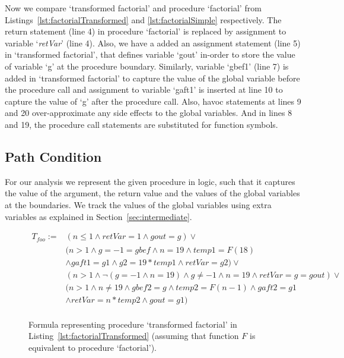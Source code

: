 \documentclass{llncs}
\newcommand{\foo}{\textit{foo}}
\newcommand{\pathCondition}{\mathit{T_{\foo}}}
\newcommand{\retVar}{\textit{retVar}}
\newcommand{\F}{\mathit{F}}
\begin{document}
Now we compare `transformed factorial' and procedure `factorial' from
Listings~\ref{lst:factorialTransformed} and \ref{lst:factorialSimple}
respectively. The return statement (line 4) in procedure `factorial'
is replaced by assignment to variable `\retVar' (line 4). Also, we
have a added an assignment statement (line 5) in `transformed
factorial', that defines variable `gout' in-order to store the value
of variable `g' at the procedure boundary. Similarly, variable `gbef1'
(line 7) is added in `transformed factorial' to capture the value of
the global variable before the procedure call and assignment to
variable `gaft1' is inserted at line 10 to capture the value of `g'
after the procedure call. Also, havoc statements at lines 9 and 20
over-approximate any side effects to the global variables. And in
lines 8 and 19, the procedure call statements are substituted for
function symbols.

\subsection{Path Condition}
For our analysis we represent the given procedure in logic, such that
it captures the value of the argument, the return value and the values
of the global variables at the boundaries. We track the values of the
global variables using extra variables as explained in
Section~\ref{sec:intermediate}.

\begin{figure}
  \begin{align*}
    \pathCondition :=
    &(n \leq 1 \wedge retVar = 1 \wedge gout = g) \vee \\
    &(n > 1 \wedge g = -1 = gbef \wedge n = 19 \wedge temp1 = \F(18) \\
    \;&\wedge gaft1 = g1 \wedge g2 = 19 * temp1
    \wedge retVar = g2) \vee\\
    &(n > 1 \wedge \neg( g = -1 \wedge n = 19) \wedge g \neq -1
    \wedge n = 19 \wedge retVar = g = gout) \vee\\
    &(n > 1 \wedge n \neq 19 \wedge gbef2 = g \wedge temp2 = \F( n
    - 1) \wedge gaft2 = g1\\
    &\wedge retVar = n * temp2 \wedge gout = g1)\\
  \end{align*}
  \caption{Formula representing procedure `transformed factorial' in
    Listing~\ref{lst:factorialTransformed} (assuming that function
    $\F$ is equivalent to procedure `factorial').}
  \label{fig:pathCondition}
\end{figure}
\end{document}
